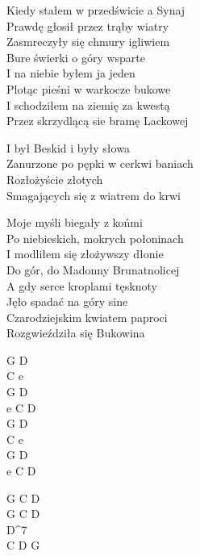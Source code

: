 
\begin{text}
    Kiedy stałem w przedświcie a Synaj\\
    Prawdę głosił przez trąby wiatry\\
    Zasmreczyły się chmury igliwiem\\
    Bure świerki o góry wsparte\\
    I na niebie byłem ja jeden\\
    Plotąc pieśni w warkocze bukowe\\
    I schodziłem na ziemię za kwestą\\
    Przez skrzydlącą sie bramę Lackowej

    \vin I był Beskid i były słowa\\
    \vin Zanurzone po pępki w cerkwi baniach\\
    \vin Rozłożyście złotych\\
    \vin Smagających się z wiatrem do krwi

    Moje myśli biegały z końmi\\
    Po niebieskich, mokrych połoninach\\
    I modliłem się złożywszy dłonie\\
    Do gór, do Madonny Brunatnolicej\\
    A gdy serce kroplami tęsknoty\\
    Jęło spadać na góry sine\\
    Czarodziejskim kwiatem paproci\\
    Rozgwieździła się Bukowina
\end{text}
\begin{chord}
    G D\\
    C e\\
    G D\\
    e C D\\
    G D\\
    C e\\
    G D\\
    e C D

    G C D\\
    G C D\\
    D^{7}\\
    C D G
\end{chord}